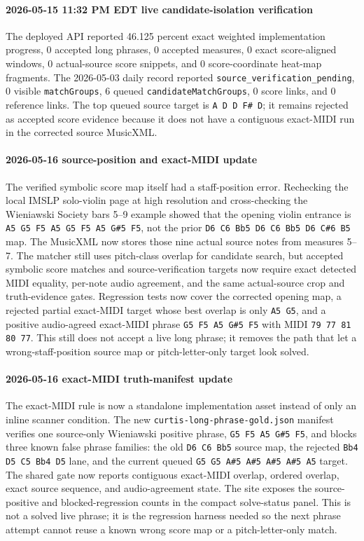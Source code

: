 \paragraph{2026-05-15 11:32 PM EDT live candidate-isolation verification} The deployed API reported 46.125 percent exact weighted implementation progress, 0 accepted long phrases, 0 accepted measures, 0 exact score-aligned windows, 0 actual-source score snippets, and 0 score-coordinate heat-map fragments. The 2026-05-03 daily record reported \texttt{source\_verification\_pending}, 0 visible \texttt{matchGroups}, 6 queued \texttt{candidateMatchGroups}, 0 score links, and 0 reference links. The top queued source target is \texttt{A D D F\# D}; it remains rejected as accepted score evidence because it does not have a contiguous exact-MIDI run in the corrected source MusicXML.

\paragraph{2026-05-16 source-position and exact-MIDI update} The verified symbolic score map itself had a staff-position error. Rechecking the local IMSLP solo-violin page at high resolution and cross-checking the Wieniawski Society bars 5--9 example showed that the opening violin entrance is \texttt{A5 G5 F5 A5 G5 F5 A5 G\#5 F5}, not the prior \texttt{D6 C6 Bb5 D6 C6 Bb5 D6 C\#6 B5} map. The MusicXML now stores those nine actual source notes from measures 5--7. The matcher still uses pitch-class overlap for candidate search, but accepted symbolic score matches and source-verification targets now require exact detected MIDI equality, per-note audio agreement, and the same actual-source crop and truth-evidence gates. Regression tests now cover the corrected opening map, a rejected partial exact-MIDI target whose best overlap is only \texttt{A5 G5}, and a positive audio-agreed exact-MIDI phrase \texttt{G5 F5 A5 G\#5 F5} with MIDI \texttt{79 77 81 80 77}. This still does not accept a live long phrase; it removes the path that let a wrong-staff-position source map or pitch-letter-only target look solved.

\paragraph{2026-05-16 exact-MIDI truth-manifest update} The exact-MIDI rule is now a standalone implementation asset instead of only an inline scanner condition. The new \texttt{curtis-long-phrase-gold.json} manifest verifies one source-only Wieniawski positive phrase, \texttt{G5 F5 A5 G\#5 F5}, and blocks three known false phrase families: the old \texttt{D6 C6 Bb5} source map, the rejected \texttt{Bb4 D5 C5 Bb4 D5} lane, and the current queued \texttt{G5 G5 A\#5 A\#5 A\#5 A\#5 A5} target. The shared gate now reports contiguous exact-MIDI overlap, ordered overlap, exact source sequence, and audio-agreement state. The site exposes the source-positive and blocked-regression counts in the compact solve-status panel. This is not a solved live phrase; it is the regression harness needed so the next phrase attempt cannot reuse a known wrong score map or a pitch-letter-only match.

